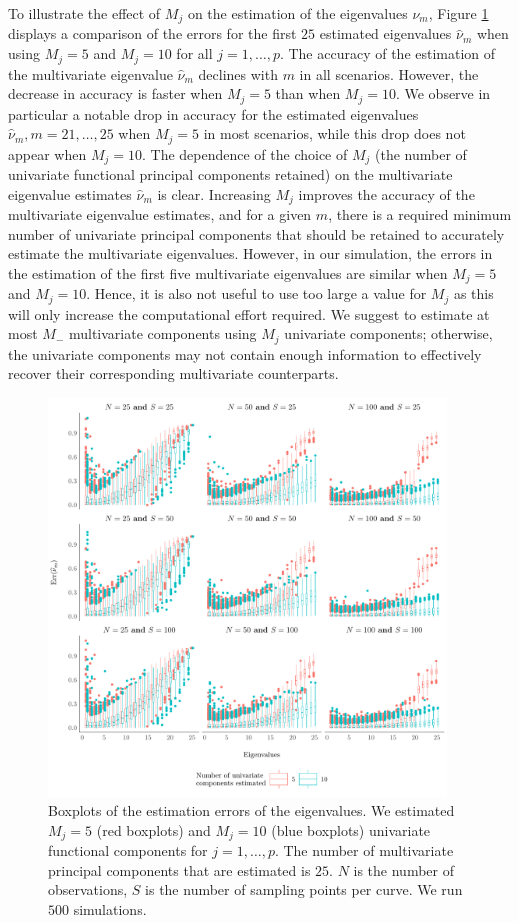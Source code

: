 \documentclass{article}
\newcounter{th}
\newcounter{scenario}[section]
\begin{document}
To illustrate the effect of $M_j$ on the estimation of the eigenvalues $\nu_m$, Figure \ref{fig:ncomp} displays a comparison of the errors for the first $25$ estimated eigenvalues $\widehat{\nu}_m$ when using $M_j = 5$ and $M_j = 10$ for all $j = 1, \ldots, p$. The accuracy of the estimation of the multivariate eigenvalue $\widehat{\nu}_m$ declines with $m$ in all scenarios. However, the decrease in accuracy is faster when $M_j = 5$ than when $M_j = 10$. We observe in particular a notable drop in accuracy for the estimated eigenvalues $\widehat{\nu}_m, m = 21, \dots, 25$ when $M_j = 5$ in most scenarios, while this drop does not appear when $M_j = 10$. The dependence of the choice of $M_j$ (the number of univariate functional principal components retained) on the multivariate eigenvalue estimates $\widehat{\nu}_m$ is clear. Increasing $M_j$ improves the accuracy of the multivariate eigenvalue estimates, and for a given $m$, there is a required minimum number of univariate principal components that should be retained to accurately estimate the multivariate eigenvalues. However, in our simulation, the errors in the estimation of the first five multivariate eigenvalues are similar when $M_j = 5$ and $M_j = 10$. Hence, it is also not useful to use too large a value for $M_j$ as this will only increase the computational effort required. We suggest to estimate at most $M_{-}$ multivariate components using $M_j$ univariate components; otherwise, the univariate components may not contain enough information to effectively recover their corresponding multivariate counterparts.
\begin{figure}
     \centering
    \includegraphics[width=0.94\textwidth]{figures/ncomp.pdf}
    \caption{Boxplots of the estimation errors of the eigenvalues. We estimated $M_j = 5$ (red boxplots) and $M_j = 10$ (blue boxplots) univariate functional components for $j = 1, \dots, p$. The number of multivariate principal components that are estimated is $25$. $N$ is the number of observations, $S$ is the number of sampling points per curve. We run $500$ simulations.}
    \label{fig:ncomp}
\end{figure}
\end{document}
